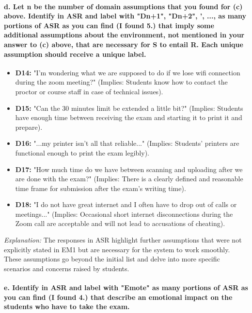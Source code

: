 \documentclass{article}
\begin{document}
\paragraph{d. Let n be the number of domain assumptions that you found for (c) above. Identify in ASR and label with "Dn+1", "Dn+2", ', ..., as many portions of ASR as you can find (I found 5.) that imply some additional assumptions about the environment, not mentioned in your answer to (c) above, that are necessary for S to entail R. Each unique assumption should receive a unique label.}

\begin{itemize}
    \item \textbf{D14:} "I'm wondering what we are supposed to do if we lose wifi connection during the zoom meeting?" (Implies: Students know how to contact the proctor or course staff in case of technical issues).
    \item \textbf{D15:} "Can the 30 minutes limit be extended a little bit?" (Implies: Students have enough time between receiving the exam and starting it to print it and prepare).
    \item \textbf{D16:} "...my printer isn't all that reliable..." (Implies: Students' printers are functional enough to print the exam legibly).
    \item \textbf{D17:} "How much time do we have between scanning and uploading after we are done with the exam?" (Implies: There is a clearly defined and reasonable time frame for submission after the exam's writing time).
    \item \textbf{D18:} "I do not have great internet and I often have to drop out of calls or meetings..." (Implies: Occasional short internet disconnections during the Zoom call are acceptable and will not lead to accusations of cheating).
\end{itemize}

\textit{Explanation:} The responses in ASR highlight further assumptions that were not explicitly stated in EM1 but are necessary for the system to work smoothly. These assumptions go beyond the initial list and delve into more specific scenarios and concerns raised by students.

\paragraph{e. Identify in ASR and label with "Emote" as many portions of ASR as you can find (I found 4.) that describe an emotional impact on the students who have to take the exam.}
\end{document}
